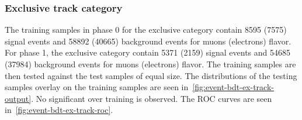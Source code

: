 \clearpage
\subsubsection{Exclusive track category}

The training samples in phase 0 for the exclusive  category contain 8595 (7575) signal events and 58892 (40665) background events for muons (electrons) flavor. For phase 1,  the exclusive  category contain 5371 (2159) signal events and 54685 (37984) background events for muons (electrons) flavor. The training samples are then tested against the test samples of equal size. The distributions of the testing samples overlay on the training samples are seen in~\ref{fig:event-bdt-ex-track-output}. No significant over training is observed. The ROC curves are seen in~\ref{fig:event-bdt-ex-track-roc}.

